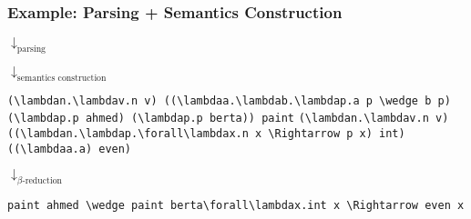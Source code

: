 \begin{frame}[fragile]
    \frametitle{Example: Parsing + Semantics Construction}
    \begin{autowidthenv}
    {\centering{}\par}\vspace{1em}
    \hspace{0.49\textwidth}$\downarrow_{\text{parsing}}$\par\vspace{1em}
    {\centering\color{logicfont!50!nlfont} \par}\vspace{1em}
    \hspace{0.49\textwidth}$\downarrow_{\text{semantics construction}}$\par\vspace{1em}
    {\centering\begin{adjustbox}{}\color{logicfont}\footnotesize\ifx\switchtomathexample\undefined
        \lstinline[language=MMT,basicstyle=\scriptsize\ttfamily]|(\lambdan.\lambdav.n v) ((\lambdaa.\lambdab.\lambdap.a p \wedge b p) (\lambdap.p ahmed) (\lambdap.p berta)) paint|\else
                    \lstinline[language=MMT]|(\lambdan.\lambdav.n v) ((\lambdan.\lambdap.\forall\lambdax.n x \Rightarrow p x) int) ((\lambdaa.a) even)|
                \fi
    \end{adjustbox}\par}\vspace{1em}
    \hspace{0.49\textwidth}$\downarrow_{\text{$\beta$-reduction}}$\par\vspace{1em}
{\centering\color{logicfont}\small\begin{adjustbox}{}\ifx\switchtomathexample\undefined\lstinline[language=MMT]|paint ahmed \wedge paint berta|\else\lstinline[language=MMT]|\forall\lambdax.int x \Rightarrow even x|\fi\end{adjustbox}\par}
    \end{autowidthenv}
\end{frame}


